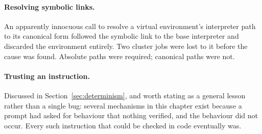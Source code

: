 \paragraph{Resolving symbolic links.} An apparently innocuous call to resolve a virtual
environment's interpreter path to its canonical form followed the symbolic link to the base
interpreter and discarded the environment entirely. Two cluster jobs were lost to it before the
cause was found. Absolute paths were required; canonical paths were not.

\paragraph{Trusting an instruction.} Discussed in Section~\ref{sec:determinism}, and worth
stating as a general lesson rather than a single bug: several mechanisms in this chapter exist
because a prompt had asked for behaviour that nothing verified, and the behaviour did not
occur. Every such instruction that could be checked in code eventually was.
